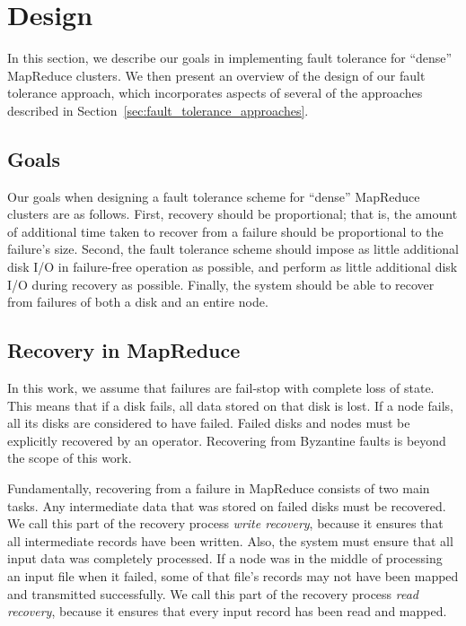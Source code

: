 \section{Design}
\label{fault_tolerance:sec:design}

In this section, we describe our goals in implementing fault tolerance for
``dense'' MapReduce clusters. We then present an overview of the design of our
fault tolerance approach, which incorporates aspects of several of the
approaches described in Section~\ref{sec:fault_tolerance_approaches}.

\subsection{Goals}

Our goals when designing a fault tolerance scheme for ``dense'' MapReduce
clusters are as follows. First, recovery should be proportional; that is, the
amount of additional time taken to recover from a failure should be
proportional to the failure's size. Second, the fault tolerance scheme should
impose as little additional disk I/O in failure-free operation as possible, and
perform as little additional disk I/O during recovery as possible. Finally, the
system should be able to recover from failures of both a disk and an entire
node.

\subsection{Recovery in MapReduce}

In this work, we assume that failures are fail-stop with complete loss of
state. This means that if a disk fails, all data stored on that disk is lost.
If a node fails, all its disks are considered to have failed. Failed disks and
nodes must be explicitly recovered by an operator. Recovering from Byzantine
faults is beyond the scope of this work.

Fundamentally, recovering from a failure in MapReduce consists of two main
tasks. Any intermediate data that was stored on failed disks must be
recovered. We call this part of the recovery process \emph{write recovery},
because it ensures that all intermediate records have been written. Also, the
system must ensure that all input data was completely processed. If a node was
in the middle of processing an input file when it failed, some of that file's
records may not have been mapped and transmitted successfully. We call this
part of the recovery process \emph{read recovery}, because it ensures that
every input record has been read and mapped.


